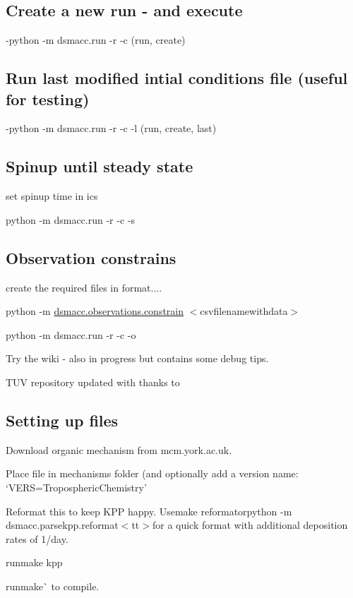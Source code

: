 \subsection*{Create a new run -\/ and execute}

-\/{\ttfamily python -\/m dsmacc.\+run -\/r -\/c} (run, create)

\subsection*{Run last modified intial conditions file (useful for testing)}

-\/{\ttfamily python -\/m dsmacc.\+run -\/r -\/c -\/l} (run, create, last)

\subsection*{Spinup until steady state}


\begin{DoxyItemize}
\item set spinup time in ics
\item {\ttfamily python -\/m dsmacc.\+run -\/r -\/c -\/s}
\end{DoxyItemize}

\subsection*{Observation constrains}


\begin{DoxyItemize}
\item create the required files in format....
\item {\ttfamily python -\/m \mbox{\hyperlink{namespacedsmacc_1_1observations_1_1constrain}{dsmacc.\+observations.\+constrain}} $<$csvfilenamewithdata$>$}
\item {\ttfamily python -\/m dsmacc.\+run -\/r -\/c -\/o}
\end{DoxyItemize}

Try the wiki -\/ also in progress but contains some debug tips.

T\+UV repository updated with thanks to 

\subsection*{Setting up files}


\begin{DoxyEnumerate}
\item Download organic mechanism from mcm.\+york.\+ac.\+uk.
\item Place file in mechanisms folder (and optionally add a version name\+: `V\+E\+RS=\textquotesingle{}Tropospheric\+Chemistry'{\ttfamily }
\item {\ttfamily Reformat this to keep K\+PP happy. Use}make reformat{\ttfamily or}python -\/m dsmacc.\+parsekpp.\+reformat$<$tt$>$for a quick format with additional deposition rates of 1/day.
\item runmake kpp{\ttfamily }
\item {\ttfamily run}make\`{} to compile.
\end{DoxyEnumerate}

